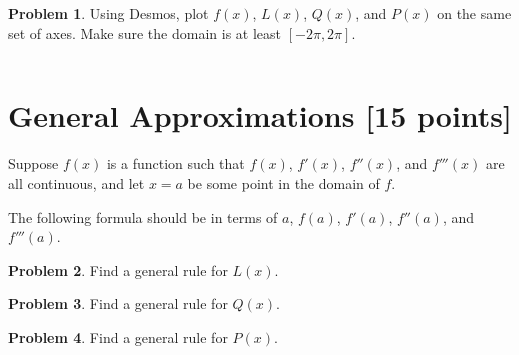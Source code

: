 \documentclass[11pt,reqno,final]{amsart}
\numberwithin{equation}{section}
\numberwithin{figure}{section}
\theoremstyle{definition} %
\newtheorem{problem}{Problem}
\begin{document}
\begin{problem}
        Using Desmos, plot $f(x)$, $L(x)$, $Q(x)$, and $P(x)$ on the same set of axes. Make sure the domain is at least $[-2\pi, 2\pi]$.
\end{problem}

$ $

\section{General Approximations [15 points]} 

Suppose $f(x)$ is a function such that $f(x)$, $f'(x)$, $f''(x)$, and $f'''(x)$ are all continuous,
and let $x = a$ be some point in the domain of $f$.

The following formula should be in terms of $a$, $f(a)$, $f'(a)$, $f''(a)$, and $f'''(a)$.

\begin{problem}
        Find a general rule for $L(x)$.
\end{problem}

\begin{problem}
        Find a general rule for $Q(x)$.
\end{problem}

\begin{problem}
        Find a general rule for $P(x)$.
\end{problem}
\end{document}
